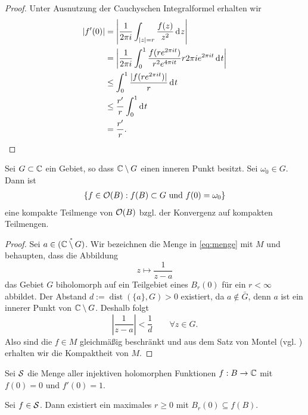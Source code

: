 \begin{proof}
  Unter Ausnutzung der Cauchyschen Integralformel erhalten wir
  \begin{align*}
    |f'(0)| & = \left | \frac{1}{2\pi i} \int_{|z| = r} \frac{f(z)}{z^2}
      \d[z] \right | \\
    & = \left | \frac{1}{2 \pi i} \int_0^1 \frac{f(r e^{2\pi it})}{r^2
        e^{4\pi i t}} r 2\pi i e^{2\pi i t} \d[t] \right | \\
    & \leq \int_0^1 \frac{|f(r e^{2\pi it})|}{r} \d[t] \\
    & \leq \frac{r'}{r} \int_0^1 \d[t] \\
    & = \frac{r'}{r}.
  \end{align*}
\end{proof}

\begin{lemma}
  \label{lemma:funktion-kompakt}
  Sei $G \subset \C$ ein Gebiet, so dass $\C\setminus G$ einen inneren
  Punkt besitzt. Sei $\omega_0 \in G$. Dann ist
  \begin{align}
  \{f \in \hol(B): f(B) \subset G \text{ und } f(0) = \omega_0
  \} \label{eq:menge} 
  \end{align}
  eine kompakte Teilmenge von $\hol(B)$ bzgl. der Konvergenz auf
  kompakten Teilmengen.
\end{lemma}

\begin{proof}
  Sei $a  \in \mathring{(\C \setminus G)}$. Wir bezeichnen die
  Menge in  \eqref{eq:menge} mit $M$ und behaupten, dass die Abbildung
  \[
  z \mapsto \frac{1}{z-a}
  \]
  das Gebiet $G$ biholomorph auf ein Teilgebiet eines
  $B_r(0)$ für ein $r < \infty$ abbildet. 
  Der Abstand $d:= \operatorname{dist}(\{a\},G)> 0$ existiert, da $a \notin \bar
  G$, denn $a$ ist ein innerer Punkt von $\C \setminus G$. Deshalb
  folgt
  \[
  \left | \frac{1}{z-a} \right |< \frac1d \qquad \forall z \in G.
  \]
  Also sind die $f \in M$ gleichmäßig beschränkt und aus dem Satz von
  Montel (vgl. \cite[Satz 4.9]{Frei}) erhalten wir die Kompaktheit von $M$.
\end{proof}

\begin{defin}
  Sei $\S$\index{$\S$} die Menge aller injektiven holomorphen Funktionen $f: B \ra
  \C$ mit $f(0) = 0$ und $f'(0)= 1$.
\end{defin}

\begin{lemma}
  \label{lemma:schlicht-max-rad}
  Sei $f \in \S$. Dann existiert ein maximales $r \geq 0$ mit $B_r(0) \subseteq
  f(B)$.
\end{lemma}

